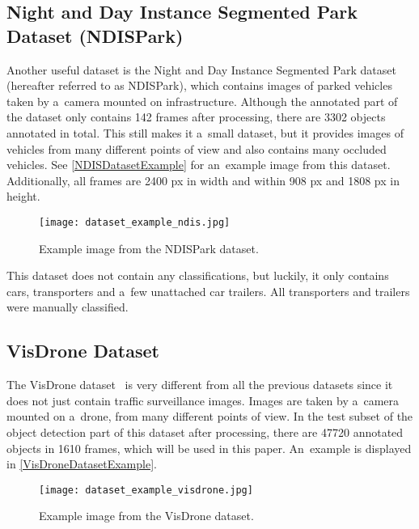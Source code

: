 \subsection{Night and Day Instance Segmented Park Dataset (NDISPark)}

Another useful dataset is the Night and Day Instance Segmented Park
dataset~\cite{Luca2022} (hereafter referred to as NDISPark), which contains
images of parked vehicles taken by a~camera mounted on infrastructure. Although
the annotated part of the dataset only contains \num{142} frames after
processing, there are \num{3302} objects annotated in total. This still makes it
a~small dataset, but it provides images of vehicles from many different points of
view and also contains many occluded vehicles. See \autoref{NDISDatasetExample}
for an~example image from this dataset. Additionally, all frames are \num{2400}
px in width and within \num{908} px and \num{1808} px in height.

\begin{figure}[t]
    \centering
    \texttt{[image: dataset\_example\_ndis.jpg]}
    \captionsetup{width=0.7\textwidth}
    \caption{Example image from the NDISPark dataset.}
    \label{NDISDatasetExample}
\end{figure}

This dataset does not contain any classifications, but luckily, it only contains
cars, transporters and a~few unattached car trailers. All transporters and
trailers were manually classified.


\subsection{VisDrone Dataset}

The VisDrone dataset~\cite{Zhu2022} is very different from all the previous
datasets since it does not just contain traffic surveillance images. Images are
taken by a~camera mounted on a~drone, from many different points of view. In the
test subset of the object detection part of this dataset after processing, there
are \num{47720} annotated objects in \num{1610} frames, which will be used in
this paper. An~example is displayed in \autoref{VisDroneDatasetExample}.

\begin{figure}[t]
    \centering
    \texttt{[image: dataset\_example\_visdrone.jpg]}
    \caption{Example image from the VisDrone dataset.}
    \label{VisDroneDatasetExample}
\end{figure}

